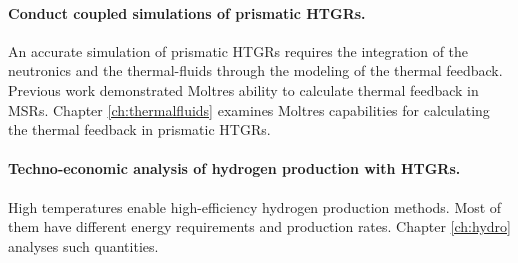 \paragraph{Conduct coupled simulations of prismatic HTGRs.}
An accurate simulation of prismatic HTGRs requires the integration of the neutronics and the thermal-fluids through the modeling of the thermal feedback.
Previous work demonstrated Moltres ability to calculate thermal feedback in MSRs.
Chapter \ref{ch:thermalfluids} examines Moltres capabilities for calculating the thermal feedback in prismatic HTGRs.

\paragraph{Techno-economic analysis of hydrogen production with HTGRs.}
High temperatures enable high-efficiency hydrogen production methods.
Most of them have different energy requirements and production rates.
Chapter \ref{ch:hydro} analyses such quantities.